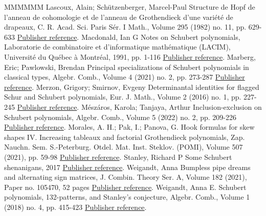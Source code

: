 \documentclass[11pt]{article}
\theoremstyle{definition}
\numberwithin{equation}{section}
\begin{document}
\begin{thebibliography}{MMMMMM}
 Lascoux, Alain; Schützenberger, Marcel-Paul Structure de Hopf de l’anneau de cohomologie et de l’anneau de Grothendieck d’une variété de drapeaux, C. R. Acad. Sci. Paris Sér. I Math., Volume 295 (1982) no. 11, pp. 629-633 \href{https://alco.centre-mersenne.org/articles/10.5802/alco.422/#LS82b}{Publisher reference}.
 Macdonald, Ian G Notes on Schubert polynomials, Laboratorie de combinatoire et d’informatique mathématique (LACIM), Université du Québec à Montréal, 1991, pp. 1-116 \href{https://alco.centre-mersenne.org/articles/10.5802/alco.422/#Mac91}{Publisher reference}.
 Marberg, Eric; Pawlowski, Brendan Principal specializations of Schubert polynomials in classical types, Algebr. Comb., Volume 4 (2021) no. 2, pp. 273-287 \href{https://alco.centre-mersenne.org/articles/10.5802/alco.422/#MP21}{Publisher reference}.
 Merzon, Grigory; Smirnov, Evgeny Determinantal identities for flagged Schur and Schubert polynomials, Eur. J. Math., Volume 2 (2016) no. 1, pp. 227-245 \href{https://alco.centre-mersenne.org/articles/10.5802/alco.422/#MS16}{Publisher reference}.
 Mészáros, Karola; Tanjaya, Arthur Inclusion-exclusion on Schubert polynomials, Algebr. Comb., Volume 5 (2022) no. 2, pp. 209-226 \href{https://alco.centre-mersenne.org/articles/10.5802/alco.422/#MT22}{Publisher reference}.
 Morales, A. H.; Pak, I.; Panova, G. Hook formulas for skew shapes IV. Increasing tableaux and factorial Grothendieck polynomials, Zap. Nauchn. Sem. S.-Peterburg. Otdel. Mat. Inst. Steklov. (POMI), Volume 507 (2021), pp. 59-98 \href{https://alco.centre-mersenne.org/articles/10.5802/alco.422/#MPP22}{Publisher reference}.
 Stanley, Richard P Some Schubert shenanigans, 2017 \href{https://alco.centre-mersenne.org/articles/10.5802/alco.422/#Sta17}{Publisher reference}.
 Weigandt, Anna Bumpless pipe dreams and alternating sign matrices, J. Combin. Theory Ser. A, Volume 182 (2021), Paper no. 105470, 52 pages \href{https://alco.centre-mersenne.org/articles/10.5802/alco.422/#Wei21}{Publisher reference}.
 Weigandt, Anna E. Schubert polynomials, 132-patterns, and Stanley’s conjecture, Algebr. Comb., Volume 1 (2018) no. 4, pp. 415-423 \href{https://alco.centre-mersenne.org/articles/10.5802/alco.422/#Wei18}{Publisher reference}.
\end{thebibliography}
\end{document}
